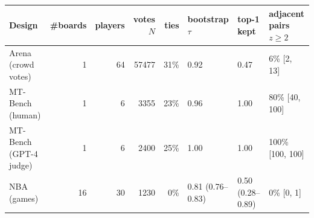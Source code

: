 \begin{tabular}{lrrrrlll}\toprule
 Design & \#boards & players & votes $N$ & ties & bootstrap $\tau$ & top-1 kept & adjacent pairs $z\geq2$ \\\midrule
Arena (crowd votes) & 1 & 64 & 57477 & 31\% & 0.92 & 0.47 & 6\% [2, 13] \\
MT-Bench (human) & 1 & 6 & 3355 & 23\% & 0.96 & 1.00 & 80\% [40, 100] \\
MT-Bench (GPT-4 judge) & 1 & 6 & 2400 & 25\% & 1.00 & 1.00 & 100\% [100, 100] \\
NBA (games) & 16 & 30 & 1230 & 0\% & 0.81 (0.76--0.83) & 0.50 (0.28--0.89) & 0\% [0, 1] \\
\bottomrule\end{tabular}

